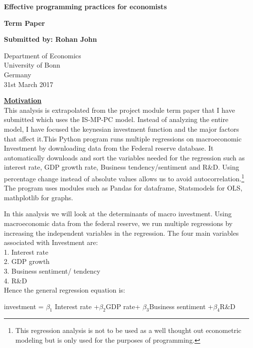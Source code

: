 \documentclass[12pt,a4paper,leqno]{report}
\theoremstyle{definition}
\begin{document}
	
\begin{titlepage}
	\begin{center}
		\vspace*{1cm}
		
		\textbf{Effective programming practices for economists}
		
		\vspace{0.5cm}
		\textbf{Term Paper} 
		
		\vspace{1cm}
		
		\textbf{Submitted by: Rohan John}
		
	   \vspace{0.5cm}
				
		Department of Economics\\
		University of Bonn\\
		Germany\\
		31st March 2017
		
		\vspace{1.5cm}
		\textbf{\underline{Motivation}} \\
		\vspace{1cm}
		This analysis is extrapolated from the project module term paper that I have submitted which uses the IS-MP-PC model. Instead of analyzing the entire model, I have focused the keynesian investment function and the major factors that affect it.This Python program runs multiple regressions on macroeconomic Investment by downloading data from the Federal reserve database. It automatically downloads and sort the variables needed for the regression such as interest rate, GDP growth rate, Business tendency/sentiment and R\&D. Using percentage change instead of absolute values allows us to avoid autocorrelation.\footnote{This regression analysis is not to be used as a well thought out econometric modeling but is only used for the purposes of programming.} The program uses modules such as Pandas for dataframe, Statsmodels for OLS, mathplotlib for graphs.
		
	\end{center}
\end{titlepage}

In this analysis we will look at the determinants of macro investment. Using macroeconomic data from the federal reserve, we run multiple regressions by increasing the independent variables in the regression. The four main variables associated with Investment are:\\
1. Interest rate\\
2. GDP growth\\
3. Business sentiment/ tendency\\
4. R\&D\\
Hence the general regression equation is: 
\begin{center}
	investment = $\beta_{1}$ Interest rate +$\beta_{2}$GDP rate+ $\beta_{3}$Business sentiment +$\beta_{4}$R\&D
\end{center}
\end{document}
